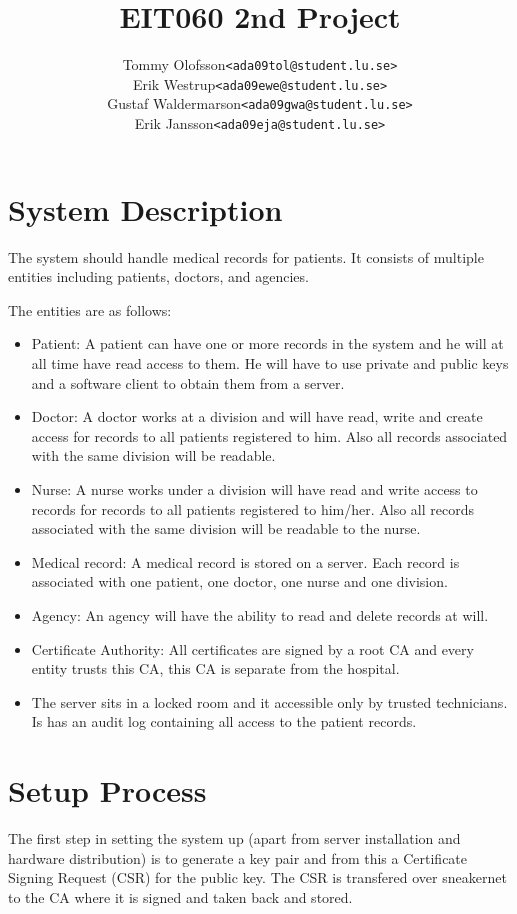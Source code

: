 \documentclass[10pt, a4paper]{article}
\title{EIT060 2nd Project}
\date{}
\author{
	\begin{tabular}{l l}
		Tommy Olofsson & \texttt{<ada09tol@student.lu.se>}\\
		Erik Westrup & \texttt{<ada09ewe@student.lu.se>}\\
		Gustaf Waldermarson & \texttt{<ada09gwa@student.lu.se>}\\
		Erik Jansson & \texttt{<ada09eja@student.lu.se>}
	\end{tabular}
}
\begin{document}
\begin{titlepage}
\maketitle
\begin{center}
\end{center}

\thispagestyle{empty}
\end{titlepage}
\setcounter{page}{2}
\section{System Description}
The system should handle medical records for patients. It consists of multiple entities including patients, doctors, and agencies. %

The entities are as follows:
\begin{itemize}
\item Patient: A patient can have one or more records in the system and he will at all time have read access to them. He will have to use private and public keys and a software client to obtain them from a server. 
\item Doctor: A doctor works at a division and will have read, write and create access for records to all patients registered to him. Also all records associated with the same division will be readable.
\item Nurse: A nurse works under a division will have read and write access to records for records to all patients registered to him/her. Also all records associated with the same division will be readable to the nurse.
\item Medical record: A medical record is stored on a server. Each record is associated with one patient, one doctor, one nurse and one division.
\item Agency: An agency will have the ability to read and delete records at will.
\item Certificate Authority: All certificates are signed by a root CA and every entity trusts this CA, this CA is separate from the hospital.
\item The server sits in a locked room and it accessible only by trusted technicians. Is has an audit log containing all access to the patient records.
\end{itemize}

\section{Setup Process}
The first step in setting the system up (apart from server installation and hardware distribution) is to generate a key pair and from this a Certificate Signing Request (CSR) for the public key. The CSR is transfered over sneakernet to the CA where it is signed and taken back and stored. 
\end{document}
